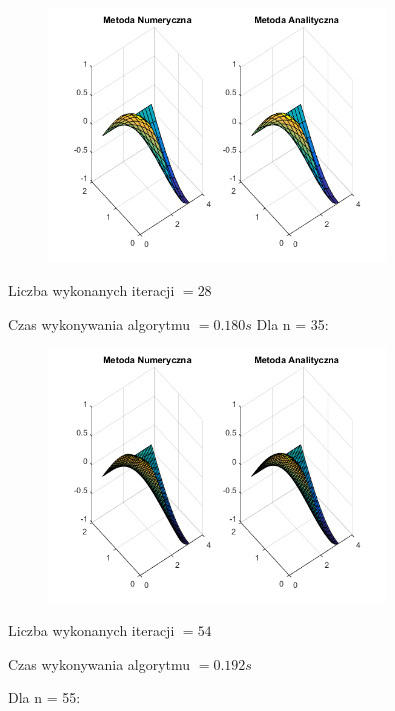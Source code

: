 \begin{figure}[!ht]
	\begin{center}
		\includegraphics[width=0.8\textwidth]{Lab6/charts/young/zad2/15.png}
	\end{center}
\end{figure}

Liczba wykonanych iteracji $ = 28 $

Czas wykonywania algorytmu $ = 0.180 s$
\newpage
Dla n = 35:

\begin{figure}[!ht]
	\begin{center}
		\includegraphics[width=0.8\textwidth]{Lab6/charts/young/zad2/35.png}
	\end{center}
\end{figure}

Liczba wykonanych iteracji $ = 54 $

Czas wykonywania algorytmu $ = 0.192 s$

Dla n = 55:

